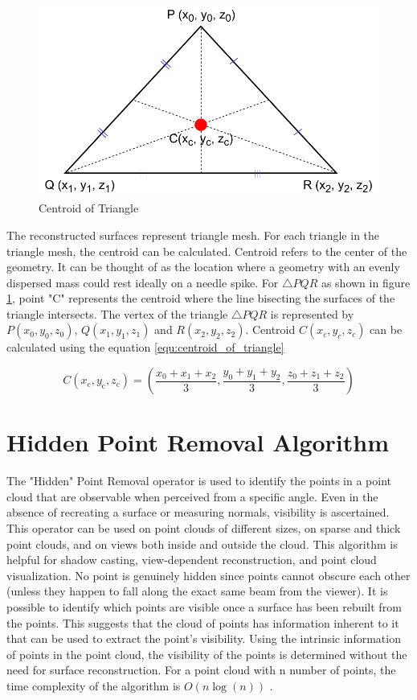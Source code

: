 \begin{figure}[htbp]
    \centering
    \includegraphics[width=0.5\linewidth]{97_graphics//related_work/centroid_of_triangle.pdf}
    \caption{Centroid of Triangle}
    \label{fig:basics-centroid_of_triangle}
\end{figure}

The reconstructed surfaces represent triangle mesh. For each triangle in the triangle mesh, the centroid can be calculated. Centroid refers to the center of the geometry. It can be thought of as the location where a geometry with an evenly dispersed mass could rest ideally on a needle spike. 
For $\triangle PQR$ as shown in figure \ref{fig:basics-centroid_of_triangle}, point "C" represents the centroid where the line bisecting the surfaces of the triangle intersects. The vertex of the triangle $\triangle PQR$ is represented by \(P(x_0, y_0, z_0)\), \(Q(x_1, y_1, z_1)\) and \(R(x_2, y_2, z_2)\). Centroid \(C(x_c, y_c, z_c)\) can be calculated using the equation \ref{equ:centroid_of_triangle}

\begin{equation}
    C(x_{\text{c}}, y_{\text{c}}, z_{\text{c}}) = \left( \frac{x_0 + x_1 + x_2}{3}, \frac{y_0 + y_1 + y_2}{3}, \frac{z_0 + z_1 + z_2}{3} \right)
    \label{equ:centroid_of_triangle}
\end{equation}

\section{Hidden Point Removal Algorithm}
The "Hidden" Point Removal operator \parencite{katz2007}is used to identify the points in a point cloud that are observable when perceived from a specific angle. Even in the absence of recreating a surface or measuring normals, visibility is ascertained.  This operator can be used on point clouds of different sizes, on sparse and thick point clouds, and on views both inside and outside the cloud. This algorithm is helpful for shadow casting, view-dependent reconstruction, and point cloud visualization. No point is genuinely hidden since points cannot obscure each other (unless they happen to fall along the exact same beam from the viewer). It is possible to identify which points are visible once a surface has been rebuilt from the points. This suggests that the cloud of points has information inherent to it that can be used to extract the point's visibility. Using the intrinsic information of points in the point cloud, the visibility of the points is determined without the need for surface reconstruction. For a point cloud with n number of points, the time complexity of the algorithm is \(O(n\log(n))\) \parencite{katz2007}.

